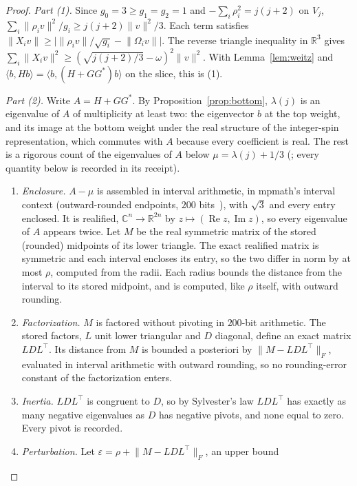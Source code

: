 \documentclass[11pt]{article}
\theoremstyle{definition}
\theoremstyle{remark}
\newcommand{\norm}[1]{\lVert #1\rVert}
\newcommand{\RR}{\mathbb{R}}
\begin{document}
\begin{proof}
\emph{Part (1).} Since $g_0=3\ge g_1=g_2=1$ and $-\sum_i\rho_i^2=j(j+2)$ on $V_j$,
$\sum_i\norm{\rho_iv}^2/g_i\ge j(j+2)\norm v^2/3$. Each term satisfies
$\norm{X_iv}\ge\bigl|\norm{\rho_iv}/\sqrt{g_i}-\norm{\Omega_iv}\bigr|$. The reverse triangle inequality
in $\RR^3$ gives $\sum_i\norm{X_iv}^2\ge(\sqrt{j(j+2)/3}-\omega)^2\norm v^2$. With
Lemma~\ref{lem:weitz} and $\langle b,Hb\rangle=\langle b,(H+GG^*)b\rangle$ on the slice, this is (1).

\emph{Part (2).} Write $A=H+GG^*$. By Proposition~\ref{prop:bottom}, $\lambda(j)$ is an eigenvalue of $A$
of multiplicity at least two: the eigenvector $b$ at the top weight, and its image at the bottom weight
under the real structure of the integer-spin representation, which commutes with $A$ because every
coefficient is real. The rest is a rigorous count of the eigenvalues of $A$ below $\mu=\lambda(j)+1/3$
(; every quantity below is recorded in its receipt).
\begin{enumerate}
  \item \emph{Enclosure.} $A-\mu$ is assembled in interval arithmetic, in mpmath's interval context
    (outward-rounded endpoints, $200$ bits~\cite{mpmath}), with $\sqrt3$ and every entry enclosed. It is
    realified, $\mathbb C^n\to\RR^{2n}$ by $z\mapsto(\operatorname{Re}z,\operatorname{Im}z)$, so every
    eigenvalue of $A$ appears twice. Let $M$ be the real symmetric matrix of the stored (rounded) midpoints of its lower
    triangle. The exact realified matrix is symmetric and each interval encloses its entry, so the two
    differ in norm by at most $\rho$, computed from the radii. Each radius bounds the distance from the
    interval to its stored midpoint, and is computed, like $\rho$ itself, with outward rounding.
  \item \emph{Factorization.} $M$ is factored without pivoting in $200$-bit arithmetic. The stored factors, $L$ unit lower triangular and $D$ diagonal, define an
    exact matrix $LDL^\top$. Its distance from $M$ is bounded a posteriori by $\norm{M-LDL^\top}_F$, evaluated
    in interval arithmetic with outward rounding, so no rounding-error constant of the factorization
    enters.
  \item \emph{Inertia.} $LDL^\top$ is congruent to $D$, so by Sylvester's law $LDL^\top$ has exactly as
    many negative eigenvalues as $D$ has negative pivots, and none equal to zero. Every pivot is recorded.
  \item \emph{Perturbation.} Let $\varepsilon=\rho+\norm{M-LDL^\top}_F$, an upper bound

\end{enumerate}
\end{proof}
\end{document}
